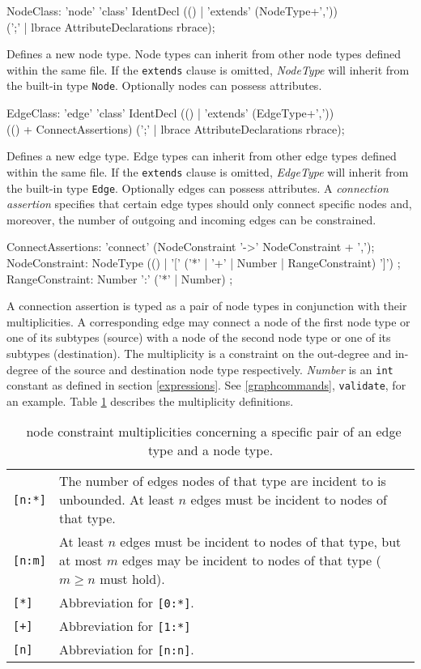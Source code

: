 \begin{rail}  
  NodeClass: 'node' 'class' IdentDecl (() | 'extends' (NodeType+',')) \\ 
    (';' | lbrace AttributeDeclarations rbrace);
\end{rail}
Defines a new node type. Node types can inherit from other node types defined within the same file. If the \texttt{extends} clause is omitted, \emph{NodeType} will inherit from the built-in type \texttt{Node}. Optionally nodes can possess attributes.

\begin{rail}    
  EdgeClass: 'edge' 'class' IdentDecl (() | 'extends' (EdgeType+',')) \\
    (() + ConnectAssertions) (';' | lbrace AttributeDeclarations rbrace);
\end{rail}
Defines a new edge type. Edge types can inherit from other edge types defined within the same file. If the \texttt{extends} clause is omitted, \emph{EdgeType} will inherit from the built-in type \texttt{Edge}. Optionally edges can possess attributes. A \emph{connection assertion} specifies that certain edge types should only connect specific nodes and, moreover, the number of outgoing and incoming edges can be constrained.

\begin{rail}  
  ConnectAssertions: 'connect' (NodeConstraint '->' NodeConstraint + ',');
  NodeConstraint: NodeType (() | '[' ('*' | '+' | Number | RangeConstraint) ']') ;
  RangeConstraint: Number ':' ('*' | Number) ;
\end{rail}
A connection assertion is typed as a pair of node types in conjunction with their multiplicities. A corresponding edge may connect a node of the first node type or one of its subtypes (source) with a node of the second node type or one of its subtypes (destination). The multiplicity is a constraint on the out-degree and in-degree of the source and destination node type respectively. \emph{Number} is an \texttt{int} constant as defined in section \ref{expressions}. See \ref{graphcommands}, \texttt{validate}, for an example. Table \ref{multiplicities} describes the multiplicity definitions.
\begin{table}[htbp]
\begin{tabularx}{\linewidth}{|l|X|}\hline
	\texttt{[n:*]} & The number of edges nodes of that type are incident to is unbounded. At least $n$ edges must be incident to nodes of that type.\\ 
	\texttt{[n:m]} & At least $n$ edges must be incident to nodes of that type, but at most $m$ edges may be incident to nodes of that type ($m \geq n$ must hold).\\
	\texttt{[*]} & Abbreviation for \texttt{[0:*]}.\\
	\texttt{[+]} & Abbreviation for \texttt{[1:*]}\\
	\texttt{[n]} & Abbreviation for \texttt{[n:n]}. \\ \hline
\end{tabularx}
\caption{\GrG\ node constraint multiplicities concerning a specific pair of an edge type and a node type.}
\label{multiplicities}
\end{table}

